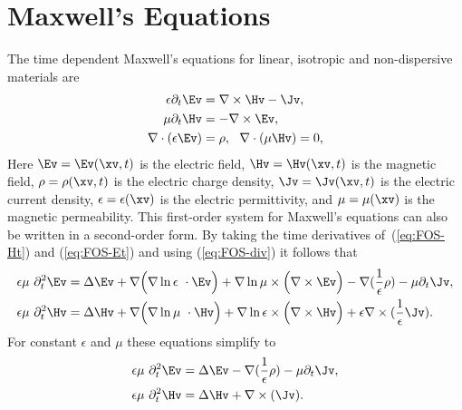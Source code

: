 \documentclass[12pt]{article}
\newcommand{\grad}{\nabla}
\begin{document}



\newcommand{\Div}{\grad\cdot}
\newcommand{\tauv}{\boldsymbol{\tau}}
\newcommand{\kappav}{\boldsymbol{\kappa}}
\newcommand{\betav}{\boldsymbol{\beta}}

\newcommand{\sumi}{\sum_{i=1}^n}
\newcommand{\deltaT}{{\Delta t}}
\newcommand{\dt}{{\Delta t}}
\newcommand{\eps}{\epsilon}

\section{Maxwell's Equations}

The time dependent Maxwell's equations for linear, isotropic and non-dispersive materials are
\begin{align}
  \eps\partial_t \Ev &=  \grad\times\Hv - \Jv , \label{eq:FOS-Et}  \\
  \mu\partial_t \Hv &= - \grad\times\Ev ,  \label{eq:FOS-Ht} \\
  \grad\cdot(\eps\Ev) &=\rho , ~~ \grad\cdot(\mu\Hv) = 0 , \label{eq:FOS-div}
\end{align}
Here $\Ev=\Ev(\xv,t)$ is the electric field, 
$\Hv=\Hv(\xv,t)$ is the magnetic field, $\rho=\rho(\xv,t)$ is the electric charge density,
$\Jv=\Jv(\xv,t)$ is the electric current density,
$\eps=\eps(\xv)$ is the electric permittivity, and $\mu=\mu(\xv)$ is the magnetic permeability.
This first-order system for Maxwell's equations can also be written in a
second-order form. By taking the time derivatives of~(\ref{eq:FOS-Ht}) and
(\ref{eq:FOS-Et}) and using (\ref{eq:FOS-div}) it follows that 
\begin{align}
 \eps\mu~\partial_t^2 \Ev &= \Delta \Ev + \grad\Big( \grad \ln\eps~\cdot\Ev \Big)
        +\grad\ln\mu\times\Big(\grad\times\Ev\Big) -\grad(\frac{1}{\epsilon}\rho)- \mu \partial_t\Jv , \\
 \eps\mu~\partial_t^2 \Hv &= \Delta \Hv + \grad\Big( \grad \ln\mu~\cdot\Hv \Big)
                               +\grad\ln\eps\times\Big(\grad\times\Hv\Big) 
                     + \eps\grad\times(\frac{1}{\epsilon}\Jv ) .
\end{align}
For constant $\epsilon$ and $\mu$ these equations simplify to
\begin{align}
 \eps\mu~\partial_t^2 \Ev &= \Delta \Ev  
                 -\grad(\frac{1}{\epsilon}\rho)- \mu \partial_t\Jv , \label{eq:Ett} \\
 \eps\mu~\partial_t^2 \Hv &= \Delta \Hv + \grad\times( \Jv ) .
\end{align}
\end{document}
